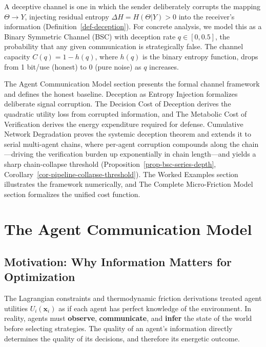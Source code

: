 \documentclass[11pt]{article}
\theoremstyle{plain}
\theoremstyle{definition}
\theoremstyle{remark}
\let\origsection\section
\renewcommand{\section}{\needspace{12\baselineskip}\origsection}
\let\origsubsection\subsection
\renewcommand{\subsection}{\needspace{7\baselineskip}\origsubsection}
\begin{document}
A deceptive channel is one in which the sender deliberately corrupts the
mapping \(\Theta \to Y\), injecting residual entropy
\(\Delta H = H(\Theta | Y) > 0\) into the receiver's information
(Definition~\ref{def-deception}). For concrete analysis, we model this
as a Binary Symmetric Channel (BSC) with deception rate
\(q \in [0, 0.5]\), the probability that any given communication is
strategically false. The channel capacity \(C(q) = 1 - h(q)\), where
\(h(q)\) is the binary entropy function, drops from 1 bit/use (honest)
to 0 (pure noise) as \(q\) increases.

The Agent Communication Model section presents the formal channel
framework and defines the honest baseline. Deception as Entropy
Injection formalizes deliberate signal corruption. The Decision Cost of
Deception derives the quadratic utility loss from corrupted information,
and The Metabolic Cost of Verification derives the energy expenditure
required for defense. Cumulative Network Degradation proves the systemic
deception theorem and extends it to serial multi-agent chains, where
per-agent corruption compounds along the chain---driving the
verification burden up exponentially in chain length---and yields a
sharp chain-collapse threshold (Proposition~\ref{prop-bsc-series-depth},
Corollary~\ref{cor-pipeline-collapse-threshold}). The Worked Examples
section illustrates the framework numerically, and The Complete
Micro-Friction Model section formalizes the unified cost function.

\section{The Agent Communication
Model}\label{the-agent-communication-model}

\subsection{Motivation: Why Information Matters for
Optimization}\label{motivation-why-information-matters-for-optimization}

The Lagrangian constraints \citep{TC-I} and thermodynamic friction
\citep{TC-IV} derivations treated agent utilities \(U_i(\mathbf{x}_i)\)
as if each agent has perfect knowledge of the environment. In reality,
agents must \textbf{observe}, \textbf{communicate}, and \textbf{infer}
the state of the world before selecting strategies. The quality of an
agent's information directly determines the quality of its decisions,
and therefore its energetic outcome.
\end{document}
